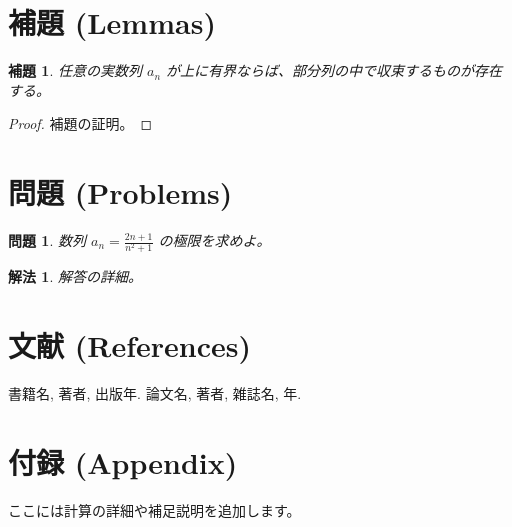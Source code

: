 \documentclass[12pt]{article}
\newtheorem{lemma}{補題}[section]       %
\newtheorem{problem}{問題}[section]
\newtheorem{solution}{解法}[section]
\begin{document}
\section{補題 (Lemmas)}
\begin{lemma}
    任意の実数列 $a_n$ が上に有界ならば、部分列の中で収束するものが存在する。
\end{lemma}

\begin{proof}
    補題の証明。
\end{proof}

\section{問題 (Problems)}
\begin{problem}
    数列 $a_n = \frac{2n+1}{n^2 + 1}$ の極限を求めよ。
\end{problem}

\begin{solution}
    解答の詳細。
\end{solution}

\section{文献 (References)}
\begin{thebibliography}{99}
     書籍名, 著者, 出版年.
     論文名, 著者, 雑誌名, 年.
\end{thebibliography}

\appendix
\section{付録 (Appendix)}
ここには計算の詳細や補足説明を追加します。
\end{document}
